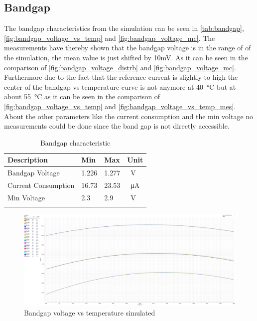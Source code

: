 \subsection{Bandgap}
\label{subsubsec:bandgap}
The bandgap characteristics from the simulation can be seen in \autoref{tab:bandgap}, \autoref{fig:bandgap_voltage_vs_temp} and \autoref{fig:bandgap_voltage_mc}. The measurements have thereby shown that the bandgap voltage is in the range of of the simulation, the mean value is just shifted by 10mV. As it can be seen in the comparison of \autoref{fig:bandgap_voltage_distrb} and \autoref{fig:bandgap_voltage_mc}. Furthermore due to the fact that the reference current is slightly to high the center of the bandgap vs temperature curve is not anymore at \qty{40}{\degreeCelsius} but at about \qty{55}{\degreeCelsius} as it can be seen in the comparison of \autoref{fig:bandgap_voltage_vs_temp} and \autoref{fig:bandgap_voltage_vs_temp_mes}. About the other parameters like the current consumption and the min voltage no measurements could be done since the band gap is not directly accessible.
\begin{longtable}{|p{5cm}|p{2.5cm}|p{2.5cm}|p{2.5cm}|}
	\hline
	\rowcolor{lightgray}
	\textbf{Description} &\textbf{Min} &\textbf{Max} & \textbf{Unit} \\ \hline
	
	Bandgap Voltage & 1.226 & 1.277 &\qty{}{\volt} \\ \hline
	Current Consumption & 16.73 & 23.53 & \qty{}{\micro\ampere} \\ \hline
	Min Voltage & 2.3& 2.9 & \qty{}{\volt} \\ \hline
	\caption{Bandgap characteristic} %
	\label{tab:bandgap}
\end{longtable}
\begin{figure}[ht]
	\centering
	\includegraphics[width=\textwidth]{images/05_bandgap/band_volt.pdf}
	\caption{Bandgap voltage vs temperature simulated}
	\label{fig:bandgap_voltage_vs_temp}
\end{figure}

